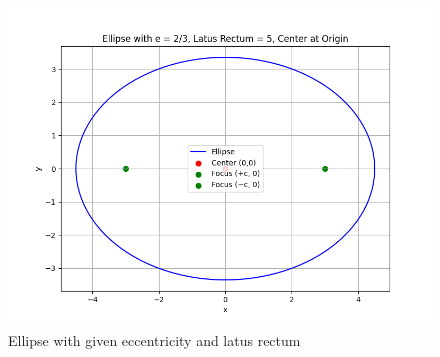 \documentclass[journal]{IEEEtran}
\begin{document}
\begin{figure}[h!t]
\centering
\includegraphics[width=0.9\linewidth]{Figs/Fig1.png}
\caption{Ellipse with given eccentricity and latus rectum}
\end{figure}
\end{document}
